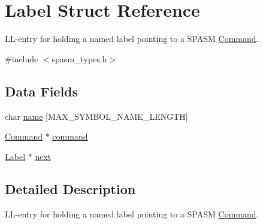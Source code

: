 \hypertarget{struct_label}{
\section{\-Label \-Struct \-Reference}
\label{struct_label}
}


\-L\-L-\/entry for holding a named label pointing to a \-S\-P\-A\-S\-M \hyperlink{struct_command}{\-Command}.  




{\ttfamily \#include $<$spasm\-\_\-types.\-h$>$}

\subsection*{\-Data \-Fields}
\begin{DoxyCompactItemize}
\item 
char \hyperlink{struct_label_a96e0274a8d36db81d857e9536c8d94e5}{name} \mbox{[}\-M\-A\-X\-\_\-\-S\-Y\-M\-B\-O\-L\-\_\-\-N\-A\-M\-E\-\_\-\-L\-E\-N\-G\-T\-H\mbox{]}
\item 
\hyperlink{struct_command}{\-Command} $\ast$ \hyperlink{struct_label_aeaf8698a75695ec399c3ce02c7804fae}{command}
\item 
\hyperlink{struct_label}{\-Label} $\ast$ \hyperlink{struct_label_aba70a946336559c889fe6a5a3e43f785}{next}
\end{DoxyCompactItemize}


\subsection{\-Detailed \-Description}
\-L\-L-\/entry for holding a named label pointing to a \-S\-P\-A\-S\-M \hyperlink{struct_command}{\-Command}. 

